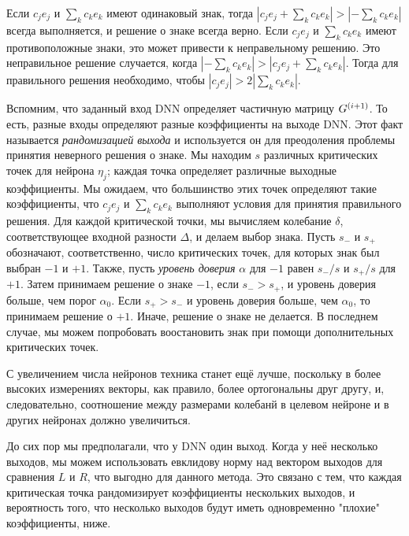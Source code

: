 Если $c_{j} e_{j}$ и $\sum \nolimits_{k}{c_{k} e_{k}}$ имеют одинаковый знак, тогда $\left |c_{j} e_{j} + \sum \nolimits_{k}{c_{k} e_{k}} \right| > \left|-\sum \nolimits_{k}{c_{k} e_{k}}\right|$ всегда выполняется, и решение о знаке всегда верно. Если $c_{j} e_{j}$ и $\sum \nolimits_{k}{c_{k} e_{k}}$ имеют противоположные знаки, это может привести к неправельному решению. Это неправильное решение случается, когда  $\left|-\sum \nolimits_{k}{c_{k} e_{k}}\right| > \left |c_{j} e_{j} + \sum \nolimits_{k}{c_{k} e_{k}} \right|$. Тогда для правильного решения необходимо, чтобы  $\left |c_{j} e_{j}\right| > 2 \left|\sum \nolimits_{k}{c_{k} e_{k}}\right|$.

Вспомним, что заданный вход DNN определяет частичную матрицу $\mathnormal{G}^{\left(i+1\right)}$. То есть, разные входы определяют разные коэффициенты на выходе DNN. Этот факт называется \textit{рандомизацией выхода} и используется он для преодоления проблемы принятия неверного решения о знаке. Мы находим $s$ различных критических точек для нейрона $\eta_{j}$; каждая точка определяет различные выходные коэффициенты. Мы ожидаем, что большинство этих точек определяют такие коэффициенты, что $c_{j} e_{j}$ и $\sum \nolimits_{k}{c_{k} e_{k}}$ выполняют условия для принятия правильного решения. Для каждой критической точки, мы вычисляем колебание $\delta$, соответствующее входной разности $\mathit{\Delta}$, и делаем выбор знака. Пусть $s_{-}$ и $s_{+}$ обозначают, соответственно, число критических точек, для которых знак был выбран $-1$ и $+1$. Также, пусть \textit{уровень доверия} $\alpha$ для $-1$ равен ${s_{-} / s}$ и $s_{+} / s$ для $+1$. Затем принимаем решение о знаке $-1$, если $s_{-} > s_{+}$, и уровень доверия больше, чем порог $\alpha_{0}$. Если $s_{+}>s_{-}$ и уровень доверия больше, чем $\alpha_{0}$, то принимаем решение о $+1$. Иначе, решение о знаке не делается. В последнем случае, мы можем попробовать воостановить знак при помощи дополнительных критических точек.

С увеличением числа нейронов техника станет ещё лучше, поскольку в более высоких измерениях векторы, как правило, более ортогональны друг другу, и, следовательно, соотношение между размерами колебанй в целевом нейроне и в других нейронах должно увеличиться.

До сих пор мы предполагали, что у DNN один выход. Когда у неё несколько выходов, мы можем использовать евклидову норму над вектором выходов для сравнения $L$ и $R$, что выгодно для данного метода. Это связано с тем, что каждая критическая точка рандомизирует коэффициенты нескольких выходов, и вероятность того, что несколько выходов будут иметь одновременно "плохие" коэффициенты, ниже.

